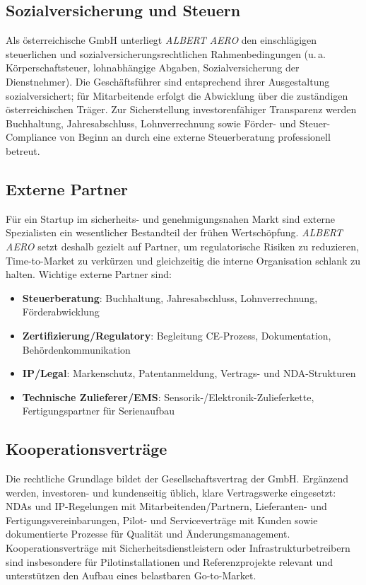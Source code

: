 \documentclass[11pt,a4paper]{article}
\begin{document}
\subsection{Sozialversicherung und Steuern}
Als österreichische GmbH unterliegt \textit{ALBERT AERO} den einschlägigen steuerlichen und sozialversicherungsrechtlichen Rahmenbedingungen (u.\,a. Körperschaftsteuer, lohnabhängige Abgaben, Sozialversicherung der Dienstnehmer). Die Geschäftsführer sind entsprechend ihrer Ausgestaltung sozialversichert; für Mitarbeitende erfolgt die Abwicklung über die zuständigen österreichischen Träger. Zur Sicherstellung investorenfähiger Transparenz werden Buchhaltung, Jahresabschluss, Lohnverrechnung sowie Förder- und Steuer-Compliance von Beginn an durch eine externe Steuerberatung professionell betreut.

\subsection{Externe Partner}
Für ein Startup im sicherheits- und genehmigungsnahen Markt sind externe Spezialisten ein wesentlicher Bestandteil der frühen Wertschöpfung. \textit{ALBERT AERO} setzt deshalb gezielt auf Partner, um regulatorische Risiken zu reduzieren, Time-to-Market zu verkürzen und gleichzeitig die interne Organisation schlank zu halten. Wichtige externe Partner sind:
\begin{itemize}
  \item \textbf{Steuerberatung}: Buchhaltung, Jahresabschluss, Lohnverrechnung, Förderabwicklung
  \item \textbf{Zertifizierung/Regulatory}: Begleitung CE-Prozess, Dokumentation, Behördenkommunikation
  \item \textbf{IP/Legal}: Markenschutz, Patentanmeldung, Vertrags- und NDA-Strukturen
  \item \textbf{Technische Zulieferer/EMS}: Sensorik-/Elektronik-Zulieferkette, Fertigungspartner für Serienaufbau
\end{itemize}

\subsection{ Kooperationsverträge}
Die rechtliche Grundlage bildet der Gesellschaftsvertrag der GmbH. Ergänzend werden, investoren- und kundenseitig üblich, klare Vertragswerke eingesetzt: NDAs und IP-Regelungen mit Mitarbeitenden/Partnern, Lieferanten- und Fertigungsvereinbarungen, Pilot- und Serviceverträge mit Kunden sowie dokumentierte Prozesse für Qualität und Änderungsmanagement. Kooperationsverträge mit Sicherheitsdienstleistern oder Infrastrukturbetreibern sind insbesondere für Pilotinstallationen und Referenzprojekte relevant und unterstützen den Aufbau eines belastbaren Go-to-Market.
\end{document}
